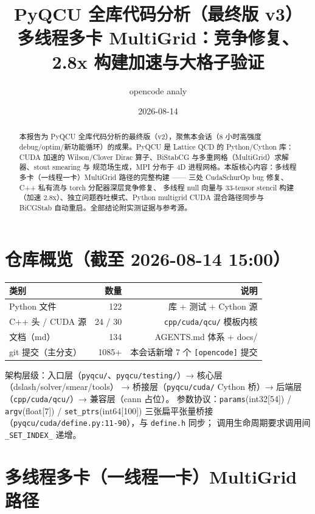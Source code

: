 \documentclass[UTF8]{ctexart}
\title{PyQCU 全库代码分析（最终版 v3）\\[6pt]\large 多线程多卡 MultiGrid：竞争修复、2.8x 构建加速与大格子验证}
\author{opencode analy}
\date{2026-08-14}
\begin{document}
\maketitle
\begin{abstract}
本报告为 PyQCU 全库代码分析的最终版（v2），聚焦本会话（8 小时高强度
debug/optim/新功能循环）的成果。PyQCU 是 Lattice QCD 的 Python/Cython 库：CUDA 加速的
Wilson/Clover Dirac 算子、BiStabCG 与多重网格（MultiGrid）求解器、stout smearing 与
规范场生成，MPI 分布于 4D 进程网格。本版核心内容：多线程多卡（一线程一卡）MultiGrid
路径的完整构建 —— 三处 CudaSchurOp bug 修复、C++ 私有流与 torch 分配器深层竞争修复、
多线程 null 向量与 33-tensor stencil 构建（加速 2.8x）、独立问题吞吐模式、Python
multigrid CUDA 混合路径同步与 BiCGStab 自动重启。全部结论附实测证据与参考源。
\end{abstract}

\tableofcontents

\section{仓库概览（截至 2026-08-14 15:00）}

\begin{center}
\begin{tabular}{lrr}
\toprule
类别 & 数量 & 说明 \\
\midrule
Python 文件 & 122 & 库 + 测试 + Cython 源 \\
C++ 头 / CUDA 源 & 24 / 30 & \texttt{cpp/cuda/qcu/} 模板内核 \\
文档（md） & 134 & AGENTS.md 体系 + docs/ \\
git 提交（主分支） & 1085+ & 本会话新增 7 个 \texttt{[opencode]} 提交 \\
\bottomrule
\end{tabular}
\end{center}

架构层级：入口层（\texttt{pyqcu/}、\texttt{pyqcu/testing/}）→ 核心层（dslash/solver/smear/tools）
→ 桥接层（\texttt{pyqcu/cuda/} Cython 桥）→ 后端层（\texttt{cpp/cuda/qcu/}）→ 兼容层（cann 占位）。
参数协议：\texttt{params}(int32[54]) / \texttt{argv}(float[7]) / \texttt{set\_ptrs}(int64[100])
三张扁平张量桥接（\texttt{pyqcu/cuda/define.py:11-90}），与 \texttt{define.h} 同步；
调用生命周期要求调用间 \texttt{\_SET\_INDEX\_} 递增。

\section{多线程多卡（一线程一卡）MultiGrid 路径}
\end{document}
